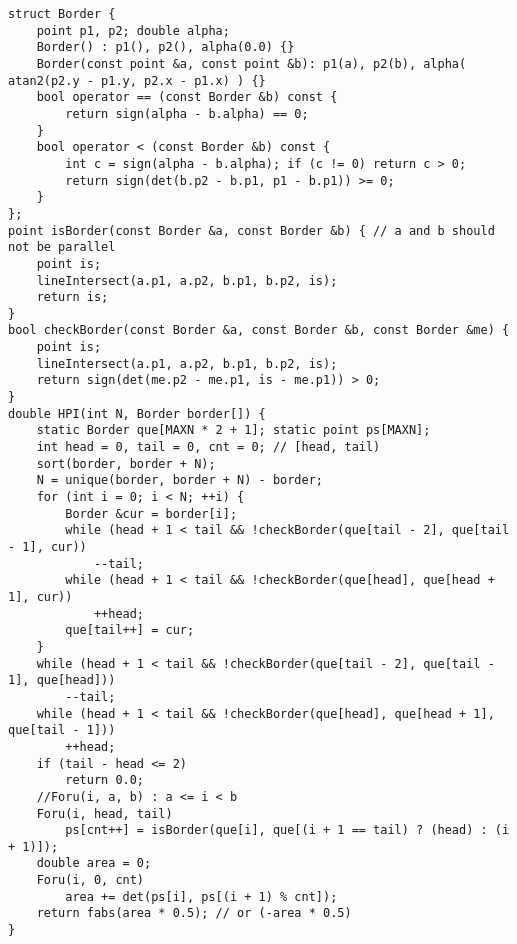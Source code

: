 \begin{lstlisting}
struct Border {
	point p1, p2; double alpha;
	Border() : p1(), p2(), alpha(0.0) {}
	Border(const point &a, const point &b): p1(a), p2(b), alpha( atan2(p2.y - p1.y, p2.x - p1.x) ) {}
	bool operator == (const Border &b) const { 
		return sign(alpha - b.alpha) == 0; 
	}
	bool operator < (const Border &b) const {
		int c = sign(alpha - b.alpha); if (c != 0) return c > 0;
		return sign(det(b.p2 - b.p1, p1 - b.p1)) >= 0;
	}
};
point isBorder(const Border &a, const Border &b) { // a and b should not be parallel
	point is; 
	lineIntersect(a.p1, a.p2, b.p1, b.p2, is); 
	return is;
}
bool checkBorder(const Border &a, const Border &b, const Border &me) {
	point is; 
	lineIntersect(a.p1, a.p2, b.p1, b.p2, is);
	return sign(det(me.p2 - me.p1, is - me.p1)) > 0;
}
double HPI(int N, Border border[]) {
	static Border que[MAXN * 2 + 1]; static point ps[MAXN];
	int head = 0, tail = 0, cnt = 0; // [head, tail)
	sort(border, border + N); 
	N = unique(border, border + N) - border;
	for (int i = 0; i < N; ++i) {
		Border &cur = border[i];
		while (head + 1 < tail && !checkBorder(que[tail - 2], que[tail - 1], cur)) 
			--tail;
		while (head + 1 < tail && !checkBorder(que[head], que[head + 1], cur)) 
			++head;
		que[tail++] = cur;
	}
	while (head + 1 < tail && !checkBorder(que[tail - 2], que[tail - 1], que[head])) 
		--tail;
	while (head + 1 < tail && !checkBorder(que[head], que[head + 1], que[tail - 1])) 
		++head;
	if (tail - head <= 2) 
		return 0.0;
	//Foru(i, a, b) : a <= i < b
	Foru(i, head, tail) 
		ps[cnt++] = isBorder(que[i], que[(i + 1 == tail) ? (head) : (i + 1)]);
	double area = 0; 
	Foru(i, 0, cnt) 
		area += det(ps[i], ps[(i + 1) % cnt]);
	return fabs(area * 0.5); // or (-area * 0.5)
}
\end{lstlisting}
